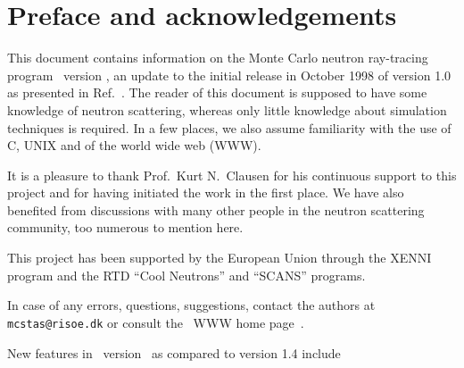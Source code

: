 
\chapter*{Preface and acknowledgements}
This document contains information on the Monte Carlo neutron
ray-tracing program \MCS\ version \version, an update to the initial
release in October 1998 of version 1.0 as presented in Ref.~\cite{nn_10_20}. The reader of this
document is supposed to have some knowledge of neutron scattering,
whereas only little knowledge about simulation techniques is
required. In a few places, we also assume familiarity with the
use of C, UNIX and of the world wide web (WWW).

It is a pleasure to thank Prof.~Kurt N.~Clausen for his continuous
support to this project and for having initiated the work in the first
place. 
We have also benefited
from discussions with many other people in the neutron scattering
community, too numerous to mention here.


This project has been supported by the European Union
through the XENNI program and the RTD ``Cool Neutrons'' and ``SCANS'' programs.

In case of any errors, questions, suggestions, %
contact the authors at \verb+mcstas@risoe.dk+
or consult the \MCS\ WWW home page~\cite{mcstas_webpage}.

New features in \MCS\ version \version\ as compared to version 1.4 include

